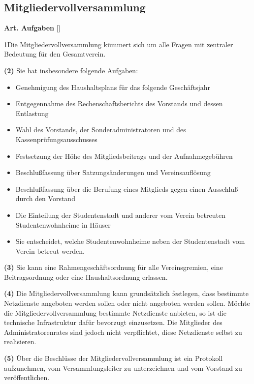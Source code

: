 \documentclass[12pt]{article}
\newcommand{\UAbschnitt}[1]{\subsection{#1}}
\newcommand{\Satz}[2]{

\begin{samepage}
{\bf (#1)} #2
\end{samepage}
}
\newenvironment{Artikel}[2]{
\bigskip \centerline{{\bf Art. #1} [#2]}
\nopagebreak
}{
}
\begin{document}
\UAbschnitt{Mitgliedervollversammlung}

\begin{Artikel}{15}{Aufgaben}

\Satz{1}{Die Mitgliedervollversammlung kümmert sich um alle Fragen mit
zentraler Bedeutung für den Gesamtverein.}

\Satz{2}{Sie hat insbesondere folgende Aufgaben:
\begin{itemize}
\item Genehmigung des Haushaltsplans für das folgende Geschäftsjahr
\item Entgegennahme des Rechenschaftsberichts des Vorstands und dessen 
Entlastung
\item Wahl des Vorstands, der Sonderadministratoren und des 
Kassenprüfungsausschusses
\item Festsetzung der Höhe des Mitgliedsbeitrags und der Aufnahmegebühren
\item Beschlußfassung über Satzungsänderungen und Vereinsauflösung
\item Beschlußfassung über die Berufung eines Mitglieds gegen einen 
Ausschluß durch den Vorstand
\item Die Einteilung der Studentenstadt und anderer vom Verein betreuten
Studentenwohnheime in Häuser
\item Sie entscheidet, welche Studentenwohnheime neben der Studentenstadt
vom Verein betreut werden.
\end{itemize}}

\Satz{3}{Sie kann eine Rahmengeschäftsordnung für alle Vereinsgremien, eine
Beitragsordnung oder eine Haushaltsordnung erlassen.}

\Satz{4}{Die Mitgliedervollversammlung kann grundsätzlich festlegen, dass
bestimmte Netzdienste angeboten werden sollen oder nicht angeboten werden
sollen. Möchte die Mitgliedervollversammlung bestimmte Netzdienste anbieten, so
ist die technische Infrastruktur dafür bevorzugt einzusetzen. Die Mitglieder
des Administratorenrates sind jedoch nicht verpflichtet, diese Netzdienste
selbst zu realisieren.}

\Satz{5}{Über die Beschlüsse der Mitgliedervollversammlung ist ein Protokoll
aufzunehmen, vom Versammlungsleiter zu unterzeichnen und vom Vorstand zu
ver\-öffent\-lichen.}

\end{Artikel}
\end{document}
